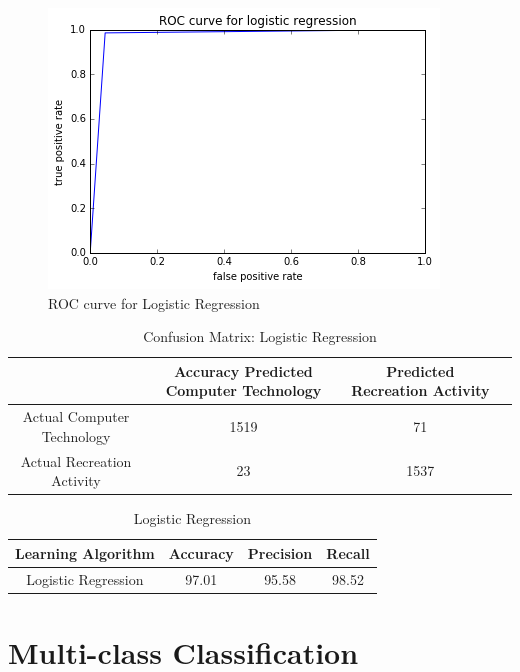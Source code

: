 \documentclass[11pt]{article}
\begin{document}
\begin{figure}[H]
	
	\includegraphics[width=\textwidth]{ROC_LogisticRegression.png}
	\caption{ROC curve for Logistic Regression}
\end{figure}

\begin{table}[h]
	\centering
	\begin{tabular}{|c|c|c|c|} \hline
		& Accuracy 		Predicted Computer Technology & Predicted Recreation Activity \\ \hline
		Actual Computer Technology & 1519 & 71 \\
		Actual Recreation Activity & 23& 1537  \\
		\hline
	\end{tabular}
	\caption{Confusion Matrix: Logistic Regression}
	\label{table:ovr_res}
\end{table}

\begin{table}[h]
	\centering
	\begin{tabular}{|c|c|c|c|} \hline
		Learning Algorithm & Accuracy & Precision & Recall\\ \hline
		Logistic Regression& 97.01 & 95.58 & 98.52 \\
		\hline
	\end{tabular}
	\caption{Logistic Regression}
	\label{table:ovr_res}
\end{table}



\section{Multi-class Classification}
\end{document}
